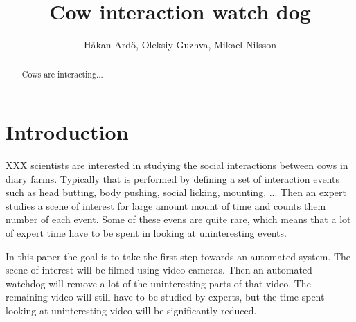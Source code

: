 \documentclass[10pt,a4paper,twocolumn]{article}
\author{Håkan Ardö, Oleksiy Guzhva, Mikael Nilsson}
\title{Cow interaction watch dog}
\begin{document}
\maketitle

\begin{abstract}
Cows are interacting...
\end{abstract}

\section{Introduction}

XXX scientists are interested in studying the social interactions between cows in diary farms. Typically that is performed by defining a set of interaction events such as head butting, body pushing, social licking, mounting, ... Then an expert studies a scene of interest for large amount mount of time and counts them number of each event. Some of these evens are quite rare, which means that a lot of expert time have to be spent in looking at uninteresting events.

In this paper the goal is to take the first step towards an automated system. The scene of interest will be filmed using video cameras. Then an automated watchdog will remove a lot of the uninteresting parts of that video. The remaining video will still have to be studied by experts, but the time spent looking at uninteresting video will be significantly reduced.
\end{document}
